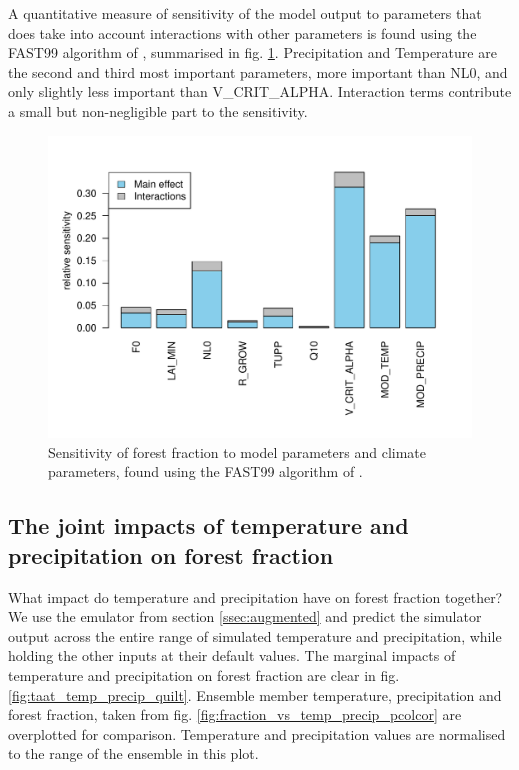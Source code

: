 \documentclass[gmd, manuscript]{copernicus}
\begin{document}
A quantitative measure of sensitivity of the model output to parameters that does take into account interactions with other parameters is found using the FAST99 algorithm of \cite{saltelli1999sensitivity}, summarised in fig. \ref{fig:fast_barplot}. Precipitation and Temperature are the second and third most important parameters, more important than NL0, and only slightly less important than V\_CRIT\_ALPHA. Interaction terms contribute a small but non-negligible part to the sensitivity.

\begin{figure}[t]
\includegraphics[width=12cm]{../graphics/fast_barplot.pdf}
\caption{Sensitivity of forest fraction to model parameters and climate parameters, found using the FAST99 algorithm of \cite{saltelli1999sensitivity}.
}
\label{fig:fast_barplot}
\end{figure}

\subsection{The joint impacts of temperature and precipitation on forest fraction}\label{ssec:joint}
What impact do temperature and precipitation have on forest fraction together? We use the emulator from section \ref{ssec:augmented} and predict the simulator output across the entire range of simulated temperature and precipitation, while holding the other inputs at their default values. The marginal impacts of temperature and precipitation on forest fraction are clear in fig. \ref{fig:taat_temp_precip_quilt}. Ensemble member temperature, precipitation and forest fraction, taken from fig. \ref{fig:fraction_vs_temp_precip_pcolcor} are overplotted for comparison. Temperature and precipitation values are normalised to the range of the ensemble in this plot.
\end{document}
